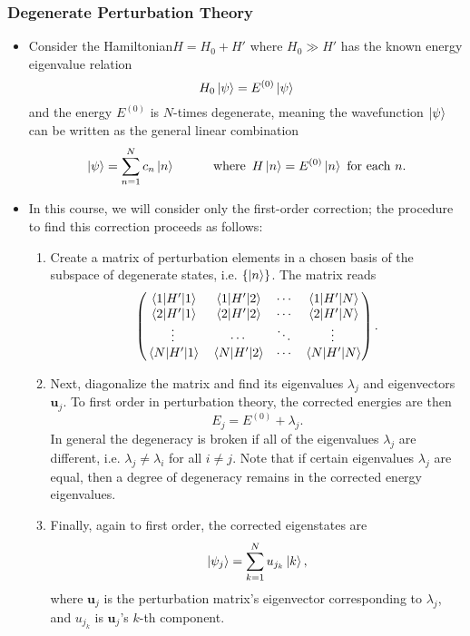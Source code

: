 \documentclass[11pt, a4paper]{article}
\newcommand{\Ham}{Hamiltonian\xspace}
\renewcommand{\vec}[1]{\bm{#1}} %
\newcommand{\p}{\psi}  %
\begin{document}
\subsubsection{Degenerate Perturbation Theory}
\begin{itemize}
	\item Consider the \Ham $ H = H_{0} + H' $ where $ H_{0} \gg H' $ has the known energy eigenvalue relation
	\begin{equation*}
		H_{0} \ket{\psi}  = E^{(0)} \ket{\psi}
	\end{equation*}
	and the energy $ E^{(0)} $ is $ N $-times degenerate, meaning the wavefunction $ \ket{\p} $ can be written as the general linear combination
	\begin{equation*}
		\ket{\psi} = \sum_{n=1}^{N}c_{n}\ket{n} \qquad \quad \text{where} \ \, H\ket{n} = E^{(0)} \ket{n} \ \text{for each } n.
	\end{equation*}
	\item In this course, we will consider only the first-order correction; the procedure to find this correction proceeds as follows:
	\begin{enumerate}
		\item Create a matrix of perturbation elements in a chosen basis of the subspace of degenerate states, i.e. $ \{\ket{n}\} $. The matrix reads
		\begin{equation*}
			\begin{pmatrix}
				\mel{1}{H'}{1} & \mel{1}{H'}{2} &  \cdots & \mel{1}{H'}{N} \\
				\mel{2}{H'}{1} & \mel{2}{H'}{2} &  \cdots & \mel{2}{H'}{N} \\
				\vdots & \cdots & \ddots & \vdots\\
				\mel{N}{H'}{1} & \mel{N}{H'}{2} &  \cdots & \mel{N}{H'}{N} 
			\end{pmatrix}.
		\end{equation*}
		
		\item Next, diagonalize the matrix and find its eigenvalues $ \lambda_{j} $ and eigenvectors $ \vec{u}_{j} $. To first order in perturbation theory, the corrected energies are then
		\begin{equation*}
			E_{j} = E^{(0)} + \lambda_{j}.
		\end{equation*}
		In general the degeneracy is broken if all of the eigenvalues $ \lambda_{j} $ are different, i.e. $ \lambda_{j} \neq \lambda_{i} $ for all $ i \neq j $. Note that if certain eigenvalues $ \lambda_{j} $ are equal, then a degree of degeneracy remains in the corrected energy eigenvalues.
		
		\item Finally, again to first order, the corrected eigenstates are 
		\begin{equation*}
			\ket{\p_{j}} = \sum_{k=1}^{N}u_{j_{k}} \ket{k},
		\end{equation*}
		where $ \vec{u}_{j} $ is the perturbation matrix's eigenvector corresponding to $ \lambda_{j} $, and $ u_{j_{k}} $ is $ \vec{u}_{j} $'s $ k $-th component.
	\end{enumerate}
\end{itemize}
\end{document}
